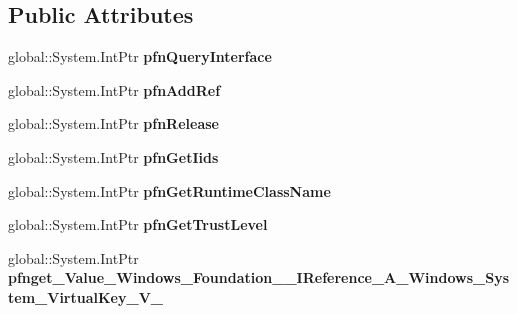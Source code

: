 \subsection*{Public Attributes}
\begin{DoxyCompactItemize}
\item 
\mbox{\label{struct_system_1_1_nullable___a___windows___system___virtual_key___v_______impl_1_1_vtbl_ae3a85e71a01780ab9ec36f39e356e55f}} 
global\+::\+System.\+Int\+Ptr {\bfseries pfn\+Query\+Interface}
\item 
\mbox{\label{struct_system_1_1_nullable___a___windows___system___virtual_key___v_______impl_1_1_vtbl_a24aabef73885752d9b96a617c40dac1a}} 
global\+::\+System.\+Int\+Ptr {\bfseries pfn\+Add\+Ref}
\item 
\mbox{\label{struct_system_1_1_nullable___a___windows___system___virtual_key___v_______impl_1_1_vtbl_ad709524732c7c19d20a99f25abf0dd7e}} 
global\+::\+System.\+Int\+Ptr {\bfseries pfn\+Release}
\item 
\mbox{\label{struct_system_1_1_nullable___a___windows___system___virtual_key___v_______impl_1_1_vtbl_a08a10302b7e5ad214157a7c9122ece41}} 
global\+::\+System.\+Int\+Ptr {\bfseries pfn\+Get\+Iids}
\item 
\mbox{\label{struct_system_1_1_nullable___a___windows___system___virtual_key___v_______impl_1_1_vtbl_a5ecfb723123bd4e6be9d25d30a1a2331}} 
global\+::\+System.\+Int\+Ptr {\bfseries pfn\+Get\+Runtime\+Class\+Name}
\item 
\mbox{\label{struct_system_1_1_nullable___a___windows___system___virtual_key___v_______impl_1_1_vtbl_a0076607794f33cc9ad8fc08faeea9c87}} 
global\+::\+System.\+Int\+Ptr {\bfseries pfn\+Get\+Trust\+Level}
\item 
\mbox{\label{struct_system_1_1_nullable___a___windows___system___virtual_key___v_______impl_1_1_vtbl_a2bb058b7234460cfa4ebb0ce776d6253}} 
global\+::\+System.\+Int\+Ptr {\bfseries pfnget\+\_\+\+Value\+\_\+\+Windows\+\_\+\+Foundation\+\_\+\+\_\+\+I\+Reference\+\_\+\+A\+\_\+\+Windows\+\_\+\+System\+\_\+\+Virtual\+Key\+\_\+\+V\+\_\+}
\end{DoxyCompactItemize}

